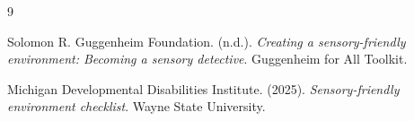 \documentclass[11pt]{article}
\begin{document}
\small
\begin{thebibliography}{9}

Solomon R. Guggenheim Foundation. (n.d.). \textit{Creating a sensory-friendly environment: Becoming a sensory detective}. Guggenheim for All Toolkit.

Michigan Developmental Disabilities Institute. (2025). \textit{Sensory-friendly environment checklist}. Wayne State University.

\end{thebibliography}
\end{document}
